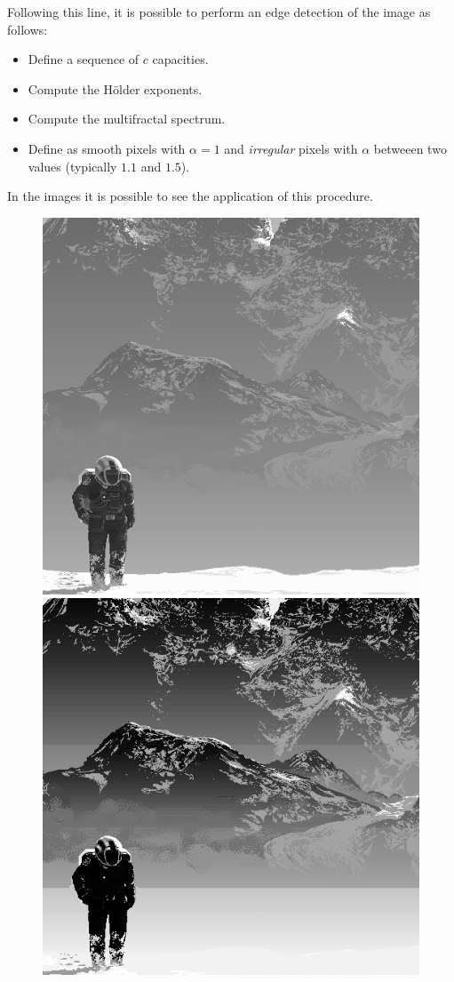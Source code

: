 \documentclass[oneside,a4paper,english,links,12pt]{article}
\begin{document}
Following this line, it is possible to perform an edge detection of the image as follows:
\begin{itemize}
\item Define a sequence of $c$ capacities.
\item Compute the H\"older exponents.
\item Compute the multifractal spectrum.
\item Define as smooth pixels with $\alpha = 1$ and {\em irregular} pixels with $\alpha$ betweeen two values (typically $1.1$ and $1.5$).
\end{itemize}

In the images it is possible to see the application of this procedure.
\begin{figure}[htb]
\centering
\includegraphics[scale=0.25]{imagenes/edge}
\includegraphics[scale=0.25]{imagenes/edgeeq}

\end{figure}
\end{document}
